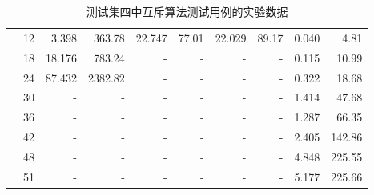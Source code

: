 \begin{table}[h!]
\begin{tabular}{| r | r | r | r | r | r | r | r | r | r |}
		{} & 12 & 3.398 & 363.78 & 22.747 & 77.01 & 22.029 & 89.17 & 0.040 & 4.81  \\
		{} & 18 & 18.176 & 783.24 & - & - & - & - & 0.115 & 10.99  \\
		{} & 24 & 87.432 & 2382.82 & - & - & - & - & 0.322 & 18.68  \\
		{} & 30 & - & - & - & - & - & - & 1.414 & 47.68  \\
		{} & 36 & - & - & - & - & - & - & 1.287 & 66.35  \\
		{} & 42 & - & - & - & - & - & - & 2.405 & 142.86  \\
		{} & 48 & - & - & - & - & - & - & 4.848 & 225.55  \\
		{} & 51 & - & - & - & - & - & - & 5.177 & 225.66  \\
		\hline
	\end{tabular}
	\caption{测试集四中互斥算法测试用例的实验数据}
	\label{tabl:data:mutual}
\end{table}


